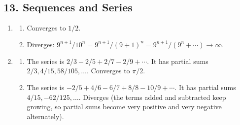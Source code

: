 \subsection*{13. Sequences and Series}
\begin{enumerate}
  \item
    \begin{enumerate}
      \item Converges to $1/2$.
      \item Diverges: $ 9^{n + 1}/10^n = 9^{n + 1}/(9 + 1)^n = 9^{n + 1}/(9^n + \cdots) \to \infty $.
    \end{enumerate}
  \item
    \begin{enumerate}
      \item The series is $ 2/3 - 2/5 + 2/7 - 2/9 + \cdots $. It has partial sums $ 2/3,4/15,58/105, \dots $. Converges to $ \pi/2 $.
      \item The series is $ -2/5 + 4/6 - 6/7 + 8/8 - 10/9 + \cdots $. It has partial sums $ 4/15,-62/125, \dots $. Diverges (the terms added and subtracted
            keep growing, so partial sums become very positive and very negative alternately).
    \end{enumerate}
\end{enumerate}


